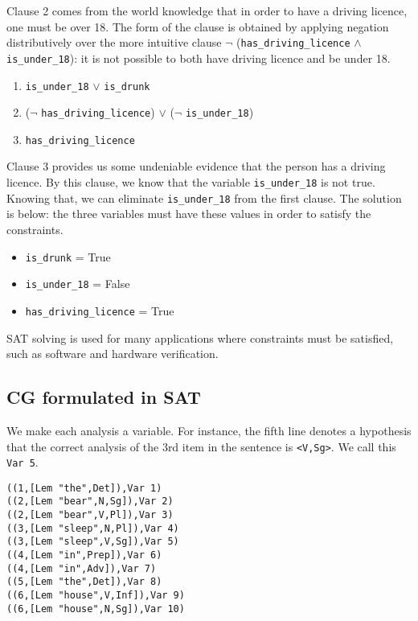 \documentclass[a4paper, 11pt]{article}
\begin{document}
Clause 2 comes from the world knowledge that in order to have a
driving licence, one must be over 18. The form of the clause is
obtained by applying negation distributively over the more intuitive
clause $\neg$ (\texttt{has\_driving\_licence} $\wedge$
\texttt{is\_under\_18}): it is not possible to both have driving
licence and be under 18.

\begin{enumerate}
\item \texttt{is\_under\_18} $\vee$ \texttt{is\_drunk}
\item ($\neg$ \texttt{has\_driving\_licence}) $\vee$ ($\neg$ \texttt{is\_under\_18})
\item \texttt{has\_driving\_licence}
\end{enumerate}

Clause 3 provides us some undeniable evidence that
the person has a driving licence. By this clause, 
we know that the variable \texttt{is\_under\_18} is not true.
Knowing that, we can eliminate \texttt{is\_under\_18} from the first
clause. 
The solution is below: the three variables must have these values in order to
satisfy the constraints.

\begin{itemize}
\item \texttt{is\_drunk} = True
\item \texttt{is\_under\_18} = False
\item \texttt{has\_driving\_licence} = True
\end{itemize}

SAT solving is used for many applications where constraints must be
satisfied, such as software and hardware verification.

\subsection{CG formulated in SAT}

We make each analysis a variable. For instance, the fifth line denotes
a hypothesis that the correct analysis of the 3rd item in the sentence
is \texttt{<V,Sg>}. We call this \texttt{Var 5}.

\begin{lstlisting}
((1,[Lem "the",Det]),Var 1)
((2,[Lem "bear",N,Sg]),Var 2)
((2,[Lem "bear",V,Pl]),Var 3)
((3,[Lem "sleep",N,Pl]),Var 4)
((3,[Lem "sleep",V,Sg]),Var 5)
((4,[Lem "in",Prep]),Var 6)
((4,[Lem "in",Adv]),Var 7)
((5,[Lem "the",Det]),Var 8)
((6,[Lem "house",V,Inf]),Var 9)
((6,[Lem "house",N,Sg]),Var 10)
\end{lstlisting}
\end{document}
